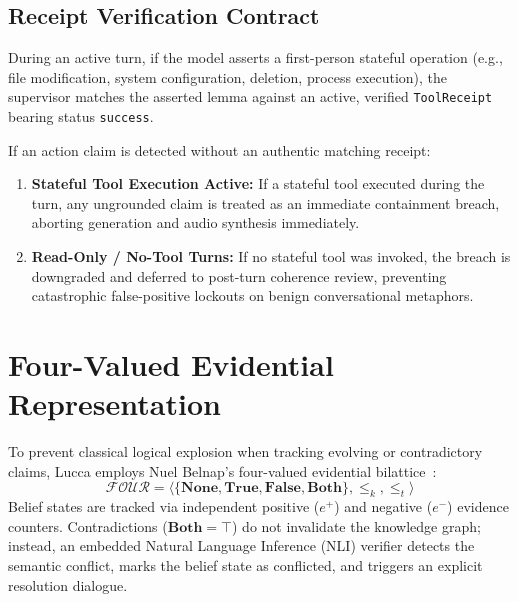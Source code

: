 \documentclass[10pt,twocolumn]{article}
\begin{document}
\subsection{Receipt Verification Contract}
During an active turn, if the model asserts a first-person stateful operation (e.g., file modification, system configuration, deletion, process execution), the supervisor matches the asserted lemma against an active, verified \texttt{ToolReceipt} bearing status \texttt{success}. 

If an action claim is detected without an authentic matching receipt:
\begin{enumerate}
    \item \textbf{Stateful Tool Execution Active:} If a stateful tool executed during the turn, any ungrounded claim is treated as an immediate containment breach, aborting generation and audio synthesis immediately.
    \item \textbf{Read-Only / No-Tool Turns:} If no stateful tool was invoked, the breach is downgraded and deferred to post-turn coherence review, preventing catastrophic false-positive lockouts on benign conversational metaphors.
\end{enumerate}

\section{Four-Valued Evidential Representation}
To prevent classical logical explosion when tracking evolving or contradictory claims, Lucca employs Nuel Belnap's four-valued evidential bilattice~\cite{belnap1977useful}:
\begin{equation}
  \mathcal{FOUR} = \langle \{\mathbf{None}, \mathbf{True}, \mathbf{False}, \mathbf{Both}\}, \le_k, \le_t \rangle
\end{equation}
Belief states are tracked via independent positive ($e^+$) and negative ($e^-$) evidence counters. Contradictions ($\mathbf{Both} = \top$) do not invalidate the knowledge graph; instead, an embedded Natural Language Inference (NLI) verifier detects the semantic conflict, marks the belief state as conflicted, and triggers an explicit resolution dialogue.
\end{document}
